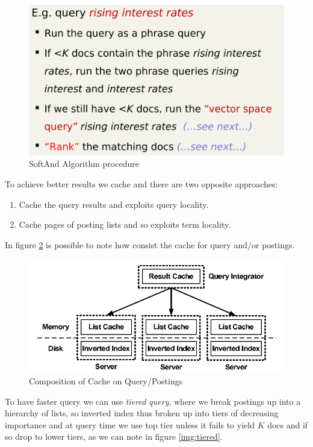\begin{figure}
	\includegraphics[width=\textwidth]{Images/softAnd}
	\caption{SoftAnd Algorithm procedure}
	\label{img:softAnd}
\end{figure}
To achieve better results we cache and there are two opposite approaches:
\begin{enumerate}
	\item Cache the query results and exploits query locality.
	\item Cache pages of posting lists and so exploits term locality.
\end{enumerate}
In figure \ref{img:cacheQuery} is possible to note how consist the cache for query and/or postings.

\begin{figure}
	\includegraphics[width=\textwidth]{Images/cacheQuery}
	\caption{Composition of Cache on Query/Postings}
	\label{img:cacheQuery}
\end{figure}
To have faster query we can use \emph{tiered query}, where we break postings up into a hierarchy of lists, so inverted index thus broken up into tiers of
decreasing importance and at query time we use top tier unless it fails to yield $K$ docs and if so drop to lower tiers, as we can note in figure \ref{img:tiered}.


